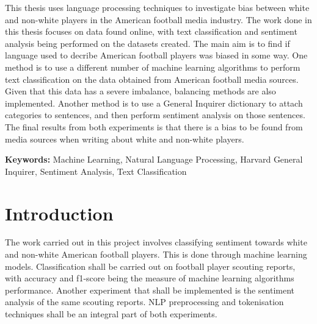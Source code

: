 \documentclass[oneside,12pt]{Classes/RoboticsLaTeX}
\begin{document}
\begin{abstracts}
This thesis uses language processing techniques to investigate bias between white and non-white players in the American football media industry. The work done in this thesis focuses on data found online, with 
text classification and sentiment analysis being performed on the datasets created. The main aim is to find if language used to decribe American football players was biased in some way. One method is to use
a different number of machine learning algorithms to perform text classification on the data obtained from American football media sources. Given that this data has a severe imbalance, balancing methods are
also implemented. Another method is to use a General Inquirer dictionary to attach categories to sentences, and then perform sentiment analysis on those sentences. The final results from both experiments is that
there is a bias to be found from media sources when writing about white and non-white players.

\textbf{Keywords: } Machine Learning, Natural Language Processing, Harvard General Inquirer, Sentiment Analysis, Text Classification
\end{abstracts}


\tableofcontents
\listoffigures
\listoftables
\printglossary[title=List of Acronyms,type=\acronymtype]

\mainmatter

\chapter{Introduction}
\label{chap:introduction}
\setcounter{page}{7}
The work carried out in this project involves classifying sentiment towards white and non-white American football players. This is done through machine learning models. Classification shall be carried out on football player scouting
reports, with accuracy and f1-score being the measure of machine learning algorithms performance. Another experiment that shall be implemented is the sentiment analysis of the same scouting reports. NLP preprocessing and tokenisation 
techniques shall be an integral part of both experiments. \par
\end{document}
